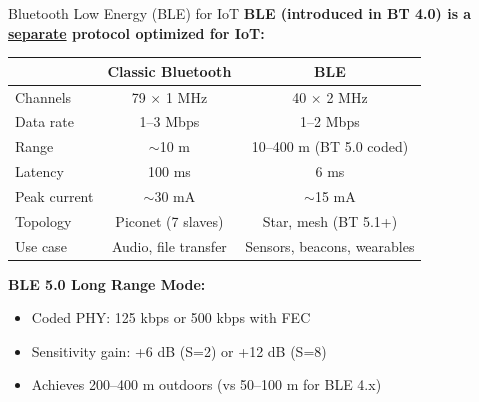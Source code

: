 \documentclass[aspectratio=169,11pt]{beamer}
\begin{document}
\begin{frame}{Bluetooth Low Energy (BLE) for IoT}
    \textbf{BLE (introduced in BT 4.0) is a \underline{separate} protocol optimized for IoT:}
    
    \vspace{0.2cm}
    \begin{center}
    \begin{tabular}{lcc}
        \toprule
        & \textbf{Classic Bluetooth} & \textbf{BLE} \\
        \midrule
        Channels & 79 $\times$ 1 MHz & 40 $\times$ 2 MHz \\
        Data rate & 1--3 Mbps & 1--2 Mbps \\
        Range & $\sim$10 m & 10--400 m (BT 5.0 coded) \\
        Latency & 100 ms & 6 ms \\
        Peak current & $\sim$30 mA & $\sim$15 mA \\
        Topology & Piconet (7 slaves) & Star, mesh (BT 5.1+) \\
        Use case & Audio, file transfer & Sensors, beacons, wearables \\
        \bottomrule
    \end{tabular}
    \end{center}
    
    \vspace{0.2cm}
    \textbf{BLE 5.0 Long Range Mode:}
    \begin{itemize}
        \item Coded PHY: 125 kbps or 500 kbps with FEC
        \item Sensitivity gain: +6 dB (S=2) or +12 dB (S=8)
        \item Achieves 200--400 m outdoors (vs 50--100 m for BLE 4.x)
    \end{itemize}
\end{frame}
\end{document}
